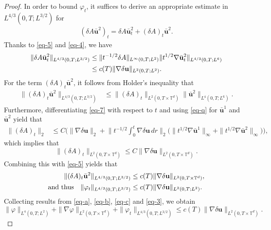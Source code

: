 \documentclass[11pt]{article}
\numberwithin{equation}{section}
\begin{document}
\begin{proof}
In order to bound $\varphi_t$, it suffices to derive an appropriate estimate in $L^{4/3}(0,T;L^{3/2})$ for
\begin{align*}
(\delta A \bar{\mathbf{u}}^2)_t = \delta A \bar{\mathbf{u}}_t^2 + (\delta A)_t \bar{\mathbf{u}}^2.
\end{align*}
Thanks to \eqref{eq-5} and \eqref{eq-4}, we have
\begin{align*}
\|\delta A \bar{\mathbf{u}}_t^2\|_{L^{4/3}(0,T;L^{3/2})} &\leq \|t^{-1/2} \delta A\|_{L^\infty(0,T;L^2)} \|t^{1/2} \nabla \bar{\mathbf{u}}_t^2\|_{L^{4/3}(0,T;L^6)} \notag \\
&\leq c(T)\|\nabla \delta \mathbf{u}\|_{L^2(0,T;L^2)}.
\end{align*}
For the term $(\delta A)_t \bar{\mathbf{u}}^2$, it follows from Holder's inequality that
\begin{align*}
\|(\delta A)_t \bar{\mathbf{u}}^2\|_{L^{4/3}(0,T;L^{3/2})} &\leq \|(\delta A)_t\|_{L^2(0,T \times \mathbb{T}^d)} \|\bar{\mathbf{u}}^2\|_{L^4(0,T;L^6)}.
\end{align*}
Furthermore, differentiating \eqref{eq-7} with respect to \( t \) and using \eqref{eq-q} for \( \bar{\mathbf{u}}^1 \) and \( \bar{\mathbf{u}}^2 \) yield that
\begin{align*}
\| (\delta A)_t \|_2 &\leq C \Big( \| \nabla \delta \mathbf{u} \|_2 + \big\| t^{-1/2} \int_0^t \nabla \delta \mathbf{u} \, dr \big\|_2 \big( \| t^{1/2} \nabla \bar{\mathbf{u}}^1 \|_\infty + \| t^{1/2} \nabla \bar{\mathbf{u}}^2 \|_\infty \big) \Big),
\end{align*}
which implies that  $$ \| (\delta A)_t \|_{L^2(0,T \times \mathbb{T}^d)} \leq C \| \nabla \delta \mathbf{u} \|_{L^2(0,T \times \mathbb{T}^d)}.$$
Combining this with \eqref{eq-5} yields  that
\begin{align}
\| (\delta A)_t \bar{\mathbf{u}}^2 \|_{L^{4/3}(0,T; L^{3/2})} &\leq c(T) \| \nabla \delta \mathbf{u} \|_{L^2(0,T \times \mathbb{T}^d)},
\label{eq-3}\\ \notag
\text{and thus} \quad \| \varphi_t \|_{L^{4/3}(0,T; L^{3/2})} &\leq c(T) \| \nabla \delta \mathbf{u} \|_{L^2(0,T; L^2)}.
\end{align}
Collecting results from \eqref{eq-a}, \eqref{eq-b}, \eqref{eq-c} and \eqref{eq-3}, we obtain
\begin{equation}
\| \varphi \|_{L^4(0,T; L^2)} + \| \nabla \varphi \|_{L^2(0,T \times \mathbb{T}^d)} + \| \varphi_t \|_{L^{4/3}(0,T; L^{3/2})} \leq c(T) \| \nabla \delta \mathbf{u} \|_{L^2(0,T \times \mathbb{T}^d)}.\label{eq-1}
\end{equation}

\end{proof}
\end{document}
